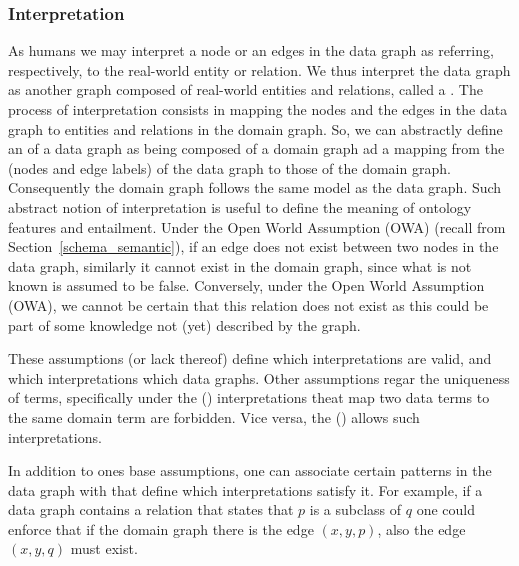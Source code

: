 \subsubsection{Interpretation}
As humans we may interpret a node or an edges in the data graph as referring, respectively, to the real-world entity or relation. We thus interpret the data graph as another graph composed of real-world entities and relations, called a . The process of interpretation consists in mapping the nodes and the edges in the data graph to entities and relations in the domain graph. So, we can abstractly define an  of a data graph as being composed of a domain graph ad a mapping from the  (nodes and edge labels) of the data graph to those of the domain graph. Consequently the domain graph follows the same model as the data graph. Such abstract notion of interpretation is useful to define the meaning of ontology features and entailment. Under the Open World Assumption (OWA) (recall from Section~\ref{schema_semantic}), if an edge does not exist between two nodes in the data graph, similarly it cannot exist in the domain graph, since what is not known is assumed to be false.  Conversely, under the Open World Assumption (OWA), we cannot be certain that this relation does not exist as this could be part of some knowledge not (yet) described by the graph. 

These assumptions (or lack thereof) define which interpretations are valid, and which interpretations which data graphs. Other assumptions regar the uniqueness of terms, specifically under the  () interpretations theat map two data terms to the same domain term are forbidden. Vice versa, the  () allows such interpretations. 

In addition to ones base assumptions, one can associate certain patterns in the data graph with  that define which interpretations satisfy it. For example, if a data graph contains a relation that states that $p$ is a subclass of $q$ one could enforce that if the domain graph there is the edge $(x,y,p)$, also the edge $(x,y,q)$ must exist.



